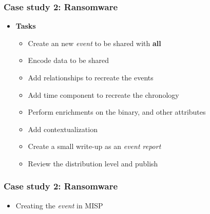 \begin{frame}
    \frametitle{Case study 2: Ransomware}
    \begin{itemize}
        \item[] \textbf{Tasks}
        \begin{itemize}
            \item Create an new \textit{event} to be shared with \textbf{all}
            \item Encode data to be shared
            \item Add relationships to recreate the events
            \item Add time component to recreate the chronology
            \item Perform enrichments on the binary, and other attributes
            \item Add contextualization
            \item Create a small write-up as an \textit{event report}
            \item Review the distribution level and publish
        \end{itemize}
    \end{itemize}
\end{frame}

\begin{frame}
    \frametitle{Case study 2: Ransomware}
    \begin{itemize}
        \item Creating the \textit{event} in MISP
    \end{itemize}
\end{frame}
